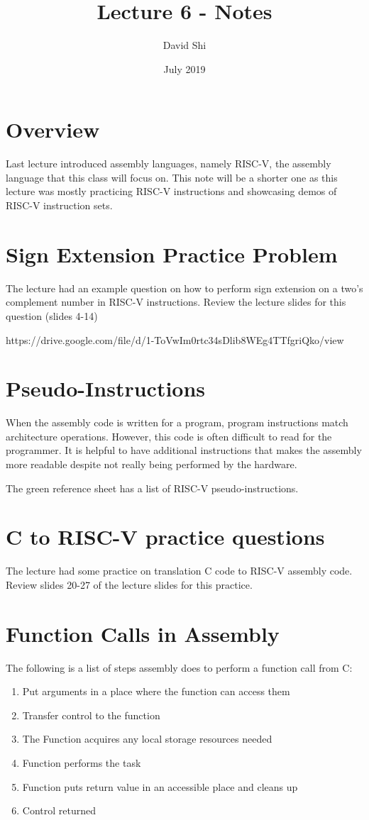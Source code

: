 \documentclass[letterpaper]{article}
\title{Lecture 6 - Notes}
\author{David Shi}
\date{July 2019}
\theoremstyle{remark}
\begin{document}
\maketitle

\section{Overview}
Last lecture introduced assembly languages, namely RISC-V, the assembly language that this class will focus on. This note will be a shorter one as this lecture was mostly practicing RISC-V instructions and showcasing demos of RISC-V instruction sets.

\section{Sign Extension Practice Problem}
The lecture had an example question on how to perform sign extension on a two's complement number in RISC-V instructions. Review the lecture slides for this question (slides 4-14)

https://drive.google.com/file/d/1-ToVwIm0rtc34sDlib8WEg4TTfgriQko/view


\section{Pseudo-Instructions}
When the assembly code is written for a program, program instructions match architecture operations. However, this code is often difficult to read for the programmer. It is helpful to have additional instructions that makes the assembly more readable despite not really being performed by the hardware.

The green reference sheet has a list of RISC-V pseudo-instructions.

\section{C to RISC-V practice questions}
The lecture had some practice on translation C code to RISC-V assembly code. Review slides 20-27 of the lecture slides for this practice.

\section{Function Calls in Assembly}
The following is a list of steps assembly does to perform a function call from C:
\begin{enumerate}
    \item Put arguments in a place where the function can access them
    \item Transfer control to the function
    \item The Function acquires any local storage resources needed
    \item Function performs the task
    \item Function puts return value in an accessible place and cleans up
    \item Control returned
\end{enumerate}
\end{document}
